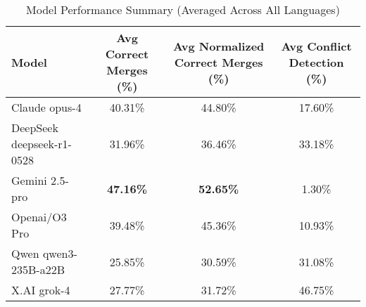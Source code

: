 \begin{table}[htbp]
\centering
\caption{Model Performance Summary (Averaged Across All Languages)}
\label{tab:model_performance_summary}
\begin{tabular}{|l|c|c|c|}
\hline
\textbf{Model} & \textbf{Avg Correct Merges (\%)} & \textbf{Avg Normalized Correct Merges (\%)} & \textbf{Avg Conflict Detection (\%)} \\
\hline
Claude opus-4 & 40.31\% & 44.80\% & 17.60\% \\
DeepSeek deepseek-r1-0528 & 31.96\% & 36.46\% & 33.18\% \\
Gemini 2.5-pro & \textbf{47.16\%} & \textbf{52.65\%} & 1.30\% \\
Openai/O3 Pro & 39.48\% & 45.36\% & 10.93\% \\
Qwen qwen3-235B-a22B & 25.85\% & 30.59\% & 31.08\% \\
X.AI grok-4 & 27.77\% & 31.72\% & 46.75\% \\
\hline
\end{tabular}
\end{table}
